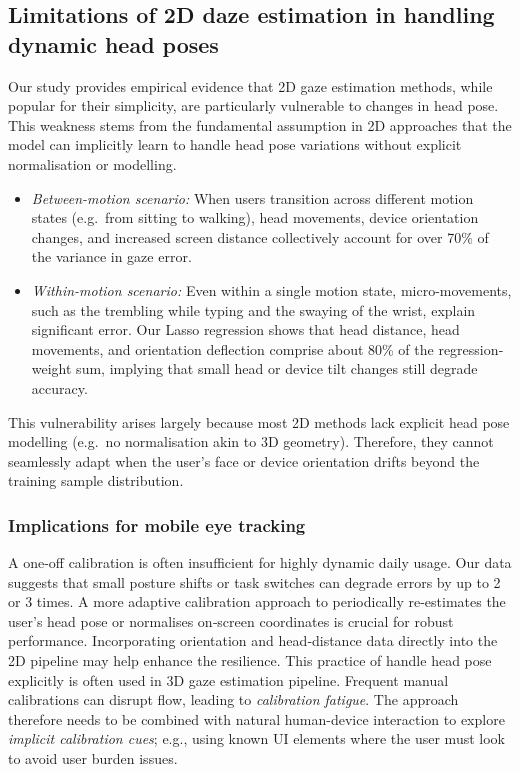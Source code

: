 \subsection{Limitations of 2D daze estimation in handling dynamic head poses}

Our study provides empirical evidence that 2D gaze estimation methods, while popular for their simplicity, are particularly vulnerable to changes in head pose. This weakness stems from the fundamental assumption in 2D approaches that the model can implicitly learn to handle head pose variations without explicit normalisation or modelling.

\begin{itemize}
    \item \textit{Between-motion scenario:} When users transition across different motion states (e.g.\ from sitting to walking), head movements, device orientation changes, and increased screen distance collectively account for over 70\% of the variance in gaze error.
    \item \textit{Within-motion scenario:} Even within a single motion state, micro-movements, such as the trembling while typing and the swaying of the wrist, explain significant error. Our Lasso regression shows that head distance, head movements, and orientation deflection comprise about 80\% of the regression‐weight sum, implying that small head or device tilt changes still degrade accuracy.
\end{itemize}
This vulnerability arises largely because most 2D methods lack explicit head pose modelling (e.g.\ no normalisation akin to 3D geometry). Therefore, they cannot seamlessly adapt when the user’s face or device orientation drifts beyond the training sample distribution.


\subsubsection{Implications for mobile eye tracking}
A one-off calibration is often insufficient for highly dynamic daily usage. Our data suggests that small posture shifts or task switches can degrade errors by up to 2 or 3 times. A more adaptive calibration approach to periodically re-estimates the user’s head pose or normalises on‐screen coordinates is crucial for robust performance. Incorporating orientation and head‐distance data directly into the 2D pipeline may help enhance the resilience. This practice of handle head pose explicitly is often used in 3D gaze estimation pipeline. Frequent manual calibrations can disrupt flow, leading to \textit{calibration fatigue}. The approach therefore needs to be combined with natural human-device interaction to explore \emph{implicit calibration cues}; e.g., using known UI elements where the user must look to avoid user burden issues.


